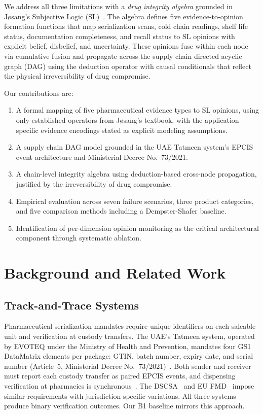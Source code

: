 \documentclass[conference]{IEEEtran}
\begin{document}
We address all three limitations with a \textit{drug integrity algebra}
grounded in J\o sang's Subjective Logic (SL)~\cite{josang2016}. The
algebra defines five evidence-to-opinion formation functions that map
serialization scans, cold chain readings, shelf life status,
documentation completeness, and recall status to SL opinions with
explicit belief, disbelief, and uncertainty. These opinions fuse within
each node via cumulative fusion and propagate across the supply chain
directed acyclic graph (DAG) using the deduction operator with causal
conditionals that reflect the physical irreversibility of drug
compromise.

Our contributions are:
\begin{enumerate}
\item A formal mapping of five pharmaceutical evidence types to SL
      opinions, using only established operators from J\o sang's
      textbook, with the application-specific evidence encodings stated
      as explicit modeling assumptions.
\item A supply chain DAG model grounded in the UAE Tatmeen system's
      EPCIS event architecture and Ministerial Decree No.~73/2021.
\item A chain-level integrity algebra using deduction-based cross-node
      propagation, justified by the irreversibility of drug compromise.
\item Empirical evaluation across seven failure scenarios, three product
      categories, and five comparison methods including a
      Dempster-Shafer baseline.
\item Identification of per-dimension opinion monitoring as the critical
      architectural component through systematic ablation.
\end{enumerate}

\section{Background and Related Work}

\subsection{Track-and-Trace Systems}

Pharmaceutical serialization mandates require unique identifiers on
each saleable unit and verification at custody transfers. The UAE's
Tatmeen system, operated by EVOTEQ under the Ministry of Health and
Prevention, mandates four GS1 DataMatrix elements per package: GTIN,
batch number, expiry date, and serial number (Article~5, Ministerial
Decree No.~73/2021)~\cite{tatmeen_decree73}. Both sender and receiver
must report each custody transfer as paired EPCIS events, and dispensing
verification at pharmacies is synchronous~\cite{tatmeen_dispenser_v3}.
The DSCSA~\cite{dscsa2013} and EU FMD~\cite{eufmd2011} impose similar
requirements with jurisdiction-specific variations. All three systems
produce binary verification outcomes. Our B1 baseline mirrors this
approach.
\end{document}
